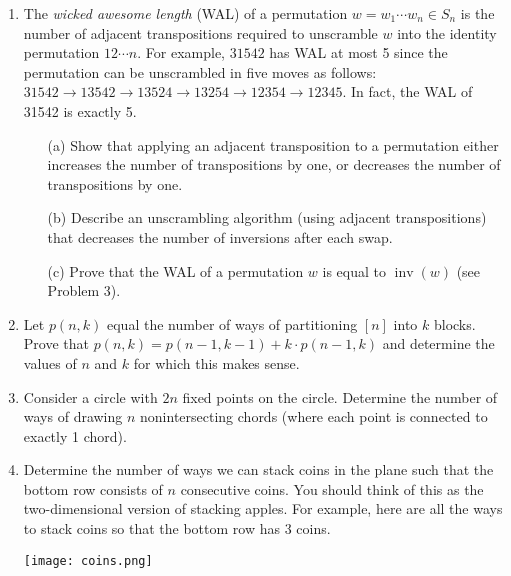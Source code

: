 \documentclass[11pt]{scrartcl}
\theoremstyle{definition}
\newcommand{\inv}{\operatorname{inv}}
\begin{document}
\begin{enumerate}

\item The \emph{wicked awesome length} (WAL) of a permutation $w=w_1\cdots w_n\in S_n$ is the number of adjacent transpositions required to unscramble $w$ into the identity permutation $12\cdots n$. For example, $31542$ has WAL at most 5 since the permutation can be unscrambled in five moves as follows: $31542 \to 13542 \to 13524 \to 13254 \to 12354 \to 12345$. In fact, the WAL of 31542 is exactly 5.
\begin{enumerate}
\item[(a)]  Show that applying an adjacent transposition to a permutation either increases the number of transpositions by one, or decreases the number of transpositions by one.
\item[(b)] Describe an unscrambling algorithm (using adjacent transpositions) that decreases the number of inversions after each swap.
\item[(c)] Prove that the WAL of a permutation $w$ is equal to $\inv(w)$ (see Problem 3).
\end{enumerate}

\item Let $p(n,k)$ equal the number of ways of partitioning $[n]$ into $k$ blocks.  Prove that $p(n,k)=p(n-1,k-1)+k\cdot p(n-1,k)$ and determine the values of $n$ and $k$ for which this makes sense.

\item Consider a circle with $2n$ fixed points on the circle.  Determine the number of ways of drawing $n$ nonintersecting chords (where each point is connected to exactly 1 chord).

\item Determine the number of ways we can stack coins in the plane such that the bottom row consists of $n$ consecutive coins.  You should think of this as the two-dimensional version of stacking apples.  For example, here are all the ways to stack coins so that the bottom row has 3 coins.
\begin{center}
\texttt{[image: coins.png]}
\end{center}


\end{enumerate}
\end{document}
